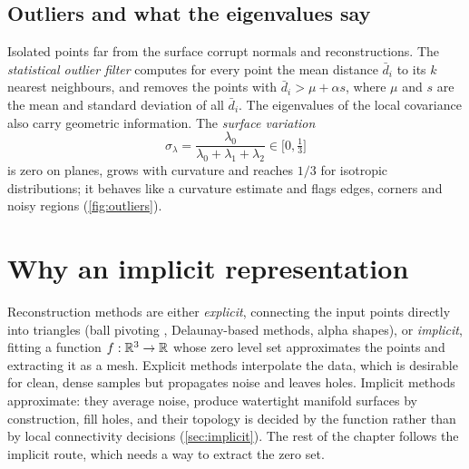 
\subsection{Outliers and what the eigenvalues say}

Isolated points far from the surface corrupt normals and reconstructions. The \emph{statistical
outlier filter} computes for every point the mean distance $\bar d_i$ to its $k$ nearest
neighbours, and removes the points with $\bar d_i>\mu+\alpha s$, where $\mu$ and $s$ are the mean
and standard deviation of all $\bar d_i$. The eigenvalues of the local covariance also carry
geometric information. The \emph{surface variation} \citep{Pauly2002}
\begin{equation}
\sigma_\lambda=\frac{\lambda_0}{\lambda_0+\lambda_1+\lambda_2}\in\bigl[0,\tfrac13\bigr]
\end{equation}
is zero on planes, grows with curvature and reaches $1/3$ for isotropic distributions; it behaves
like a curvature estimate and flags edges, corners and noisy regions (\cref{fig:outliers}).


\section{Why an implicit representation}

Reconstruction methods are either \emph{explicit}, connecting the input points directly into
triangles (ball pivoting \citep{Bernardini1999}, Delaunay-based methods, alpha shapes), or
\emph{implicit}, fitting a function $f:\mathbb{R}^3\to\mathbb{R}$ whose zero level set approximates the points and
extracting it as a mesh. Explicit methods interpolate the data, which is desirable for clean,
dense samples but propagates noise and leaves holes. Implicit methods approximate: they average
noise, produce watertight manifold surfaces by construction, fill holes, and their topology is
decided by the function rather than by local connectivity decisions (\cref{sec:implicit}). The rest
of the chapter follows the implicit route, which needs a way to extract the zero set.

